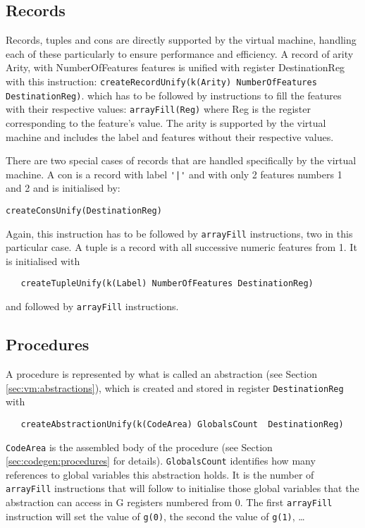 \documentclass[a4paper]{memoir}
\begin{document}
\subsection{Records}\label{sec:opcode:records}
Records, tuples and cons are directly supported by the virtual machine, handling each of these particularly to ensure performance and efficiency.
A record of arity Arity, with NumberOfFeatures features is unified with register DestinationReg with this instruction:
\lstinline!createRecordUnify(k(Arity) NumberOfFeatures DestinationReg)!. which has to be followed by instructions to fill the features with their respective values:
\lstinline!arrayFill(Reg)! where Reg is the register corresponding to the feature's value.
The arity is supported by the virtual machine and includes the label and features without their respective values.

There are two special cases of records that are handled specifically by the virtual machine.
A con is a record with label \lstinline!'|'! and with only 2 features numbers 1
and 2 and is initialised by:
\begin{lstlisting}
createConsUnify(DestinationReg)
\end{lstlisting}
Again, this instruction has to be
followed by \lstinline!arrayFill! instructions, two in this particular case.
A tuple is a record with all successive numeric features from 1. It is initialised with 
\begin{lstlisting}
   createTupleUnify(k(Label) NumberOfFeatures DestinationReg)
\end{lstlisting}
and followed by \lstinline!arrayFill! instructions.
\subsection{Procedures}\label{sec:opcode:procedures}
A procedure is represented by what is called an abstraction (see Section
\ref{sec:vm:abstractions}), which is created and stored in register
\lstinline!DestinationReg! with
\begin{lstlisting}
   createAbstractionUnify(k(CodeArea) GlobalsCount  DestinationReg)
\end{lstlisting}
\lstinline!CodeArea! is the assembled body of the procedure (see Section
\ref{sec:codegen:procedures} for details). \lstinline!GlobalsCount! identifies
how many references to global variables this abstraction holds. It is the number
of \lstinline!arrayFill! instructions that will follow to initialise those global variables
that the abstraction can access in G registers numbered from 0. The first
\lstinline!arrayFill! instruction will set the value of \lstinline!g(0)!, the
second the value of \lstinline!g(1)!,
\ldots
\end{document}
